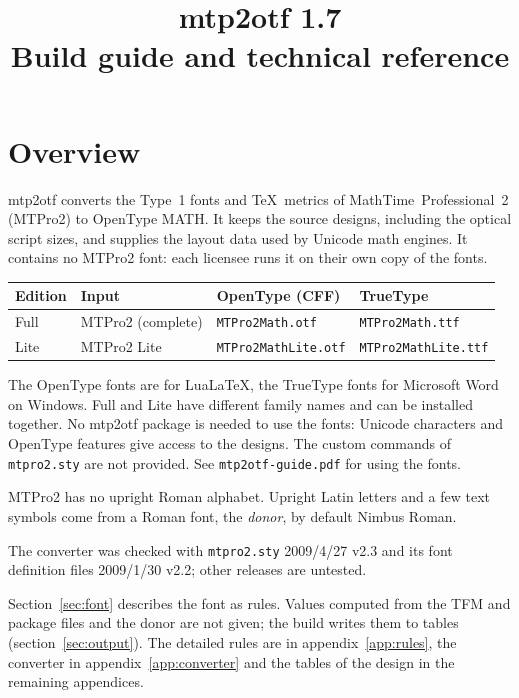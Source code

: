 \documentclass[10pt]{article}
\title{mtp2otf 1.7\\[2pt]\large Build guide and technical reference}
\author{}
\date{}
\newcommand\file[1]{\texttt{#1}}
\begin{document}
\maketitle
\tableofcontents
\clearpage

\section{Overview}

mtp2otf converts the Type~1 fonts and \TeX\ metrics of
MathTime\texttrademark\ Professional~2 (MTPro2) to OpenType MATH.  It
keeps the source designs, including the optical script sizes, and
supplies the layout data used by Unicode math engines.  It contains no
MTPro2 font: each licensee runs it on their own copy of the fonts.

\begin{center}
\begin{tabular}{llll}
\toprule
Edition & Input & OpenType (CFF) & TrueType \\
\midrule
Full & MTPro2 (complete) & \file{MTPro2Math.otf} & \file{MTPro2Math.ttf} \\
Lite & MTPro2 Lite & \file{MTPro2MathLite.otf} &
  \file{MTPro2MathLite.ttf} \\
\bottomrule
\end{tabular}
\end{center}

The OpenType fonts are for Lua\LaTeX, the TrueType fonts for Microsoft
Word on Windows.  Full and Lite have different family names and can be
installed together.  No mtp2otf package is needed to use the fonts:
Unicode characters and OpenType features give access to the designs.
The custom commands of \file{mtpro2.sty} are not provided.  See
\file{mtp2otf-guide.pdf} for using the fonts.

MTPro2 has no upright Roman alphabet.  Upright Latin letters and a few
text symbols come from a Roman font, the \emph{donor}, by default Nimbus
Roman.

The converter was checked with \file{mtpro2.sty} 2009/4/27 v2.3 and its
font definition files 2009/1/30 v2.2; other releases are untested.

Section~\ref{sec:font} describes the font as rules.  Values computed from
the TFM and package files and the donor are not given; the build writes
them to tables (section~\ref{sec:output}).  The detailed rules are in
appendix~\ref{app:rules}, the converter in appendix~\ref{app:converter}
and the tables of the design in the remaining appendices.
\end{document}
